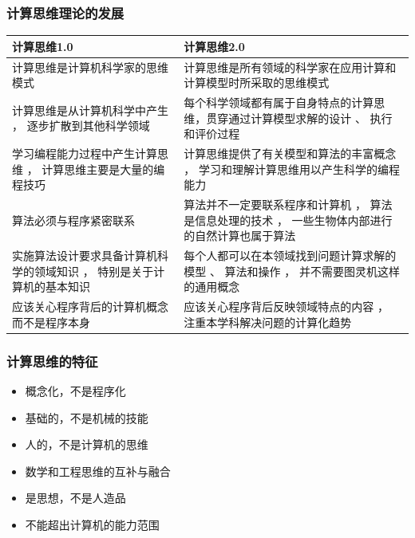 \begin{frame}
    \frametitle{计算思维理论的发展}
\begin{table}[]
    \footnotesize
    \begin{tabularx}{\textwidth} {
         >{\raggedright\arraybackslash}m{}
         >{\raggedright\arraybackslash}m{}
         }
    \toprule
    计算思维1.0                              & 计算思维2.0                                            \\ \midrule
    计算思维是计算机科学家的思维模式                     & 计算思维是所有领域的科学家在应用计算和计算模型时所采取的思维模式                   \\ \hline
    计算思维是从计算机科学中产生 ， 逐步扩散到其他科学领域         & 每个科学领域都有属于自身特点的计算思维，贯穿通过计算模型求解的设计 、 执行和评价过程        \\ \hline
    学习编程能力过程中产生计算思维 ， 计算思维主要是大量的编程技巧     & 计算思维提供了有关模型和算法的丰富概念 ， 学习和理解计算思维用以产生科学的编程能力         \\ \hline
    算法必须与程序紧密联系                          & 算法并不一定要联系程序和计算机 ， 算法是信息处理的技术 ， 一些生物体内部进行的自然计算也属于算法 \\ \hline
    实施算法设计要求具备计算机科学的领域知识 ， 特别是关于计算机的基本知识 & 每个人都可以在本领域找到问题计算求解的模型 、 算法和操作 ， 并不需要图灵机这样的通用概念     \\ \hline
    应该关心程序背后的计算机概念而不是程序本身                & 应该关心程序背后反映领域特点的内容 ， 注重本学科解决问题的计算化趋势                \\ \bottomrule
    \end{tabularx}
    \end{table}
\end{frame}


\begin{frame}
    \frametitle{计算思维的特征}
    \begin{itemize}
      \item 概念化，不是程序化
      \item 基础的，不是机械的技能
      \item 人的，不是计算机的思维
      \item 数学和工程思维的互补与融合
      \item 是思想，不是人造品
      \item 不能超出计算机的能力范围
    \end{itemize}
\end{frame}


